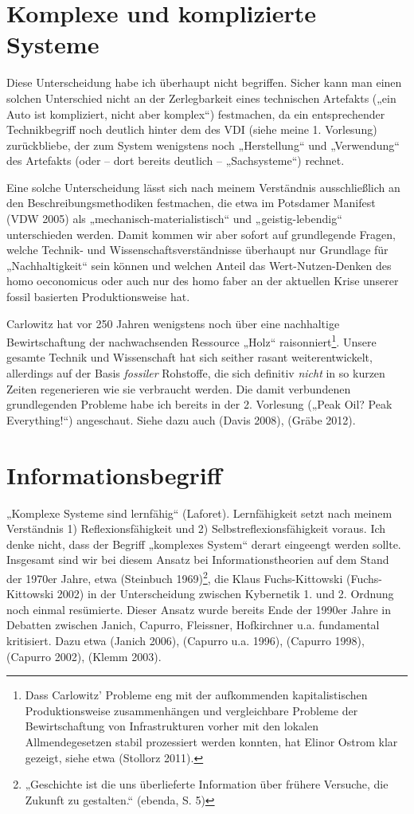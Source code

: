\documentclass[11pt,a4paper]{article}
\begin{document}
\section{Komplexe und komplizierte Systeme}

Diese Unterscheidung habe ich überhaupt nicht begriffen. Sicher kann man einen
solchen Unterschied nicht an der Zerlegbarkeit eines technischen Artefakts
(„ein Auto ist kompliziert, nicht aber komplex“) festmachen, da ein
entsprechender Technikbegriff noch deutlich hinter dem des VDI (siehe meine
1. Vorlesung) zurückbliebe, der zum System wenigstens noch „Herstellung“ und
„Verwendung“ des Artefakts (oder -- dort bereits deutlich -- „Sachsysteme“)
rechnet.

Eine solche Unterscheidung lässt sich nach meinem Verständnis ausschließlich
an den Beschreibungsmethodiken festmachen, die etwa im Potsdamer Manifest (VDW
2005) als „mechanisch-materialistisch“ und „geistig-lebendig“ unterschieden
werden.  Damit kommen wir aber sofort auf grundlegende Fragen, welche Technik-
und Wissenschaftsverständnisse überhaupt nur Grundlage für „Nachhaltigkeit“
sein können und welchen Anteil das Wert-Nutzen-Denken des homo oeconomicus
oder auch nur des homo faber an der aktuellen Krise unserer fossil basierten
Produktionsweise hat.

Carlowitz hat vor 250 Jahren wenigstens noch über eine nachhaltige
Bewirtschaftung der nachwachsenden Ressource „Holz“ raisonniert\footnote{Dass
  Carlowitz' Probleme eng mit der aufkommenden kapitalistischen
  Produktionsweise zusammenhängen und vergleichbare Probleme der
  Bewirtschaftung von Infrastrukturen vorher mit den lokalen Allmendegesetzen
  stabil prozessiert werden konnten, hat Elinor Ostrom klar gezeigt, siehe
  etwa (Stollorz 2011). }. Unsere gesamte Technik und Wissenschaft hat sich
seither rasant weiterentwickelt, allerdings auf der Basis \emph{fossiler}
Rohstoffe, die sich definitiv \emph{nicht} in so kurzen Zeiten regenerieren
wie sie verbraucht werden.  Die damit verbundenen grundlegenden Probleme habe
ich bereits in der 2. Vorlesung („Peak Oil? Peak Everything!“) angeschaut.
Siehe dazu auch (Davis 2008), (Gräbe 2012).

\section{Informationsbegriff}

„Komplexe Systeme sind lernfähig“ (Laforet). Lernfähigkeit setzt nach meinem
Verständnis 1) Reflexionsfähigkeit und 2) Selbstreflexionsfähigkeit voraus.
Ich denke nicht, dass der Begriff „komplexes System“ derart eingeengt werden
sollte.  Insgesamt sind wir bei diesem Ansatz bei Informationstheorien auf dem
Stand der 1970er Jahre, etwa (Steinbuch 1969)\footnote{„Geschichte ist die uns
  überlieferte Information über frühere Versuche, die Zukunft zu gestalten.“
  (ebenda, S. 5)}, die Klaus Fuchs-Kittowski (Fuchs-Kittowski 2002) in der
Unterscheidung zwischen Kybernetik 1. und 2. Ordnung noch einmal resümierte.
Dieser Ansatz wurde bereits Ende der 1990er Jahre in Debatten zwischen Janich,
Capurro, Fleissner, Hofkirchner u.a. fundamental kritisiert. Dazu etwa (Janich
2006), (Capurro u.a. 1996), (Capurro 1998),  (Capurro 2002), (Klemm 2003).
\end{document}
